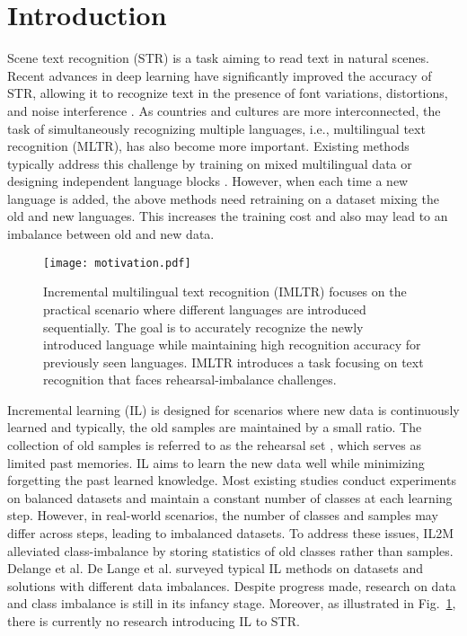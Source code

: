 \documentclass[10pt,twocolumn,letterpaper]{article}
\begin{document}
\section{Introduction}
Scene text recognition (STR) is a task aiming to read text in natural scenes. Recent advances in deep learning have significantly improved the accuracy of STR, allowing it to recognize text in the presence of font variations, distortions, and noise interference \cite{ShiBY17crnn,shi2018aster,wang2021visionlan,sheng2019nrtr,fang2022abinet++,zheng2023tps++}. As countries and cultures are more interconnected, the task of simultaneously recognizing multiple languages, i.e., multilingual text recognition (MLTR), has also become more important.
Existing methods typically address this challenge by training on mixed multilingual data \cite{buvsta2018e2emlt,baek2020crafts,nayef2019mlt2019} or designing independent language blocks \cite{huang2021multiocr,fujii2017seqscript,gomez2017improving}. However, when each time a new language is added, the above methods need retraining on a dataset mixing the old and new languages. This increases the training cost \cite{Rebuffi2017icarl,Yan2021DER} and also may lead to an imbalance \cite{belouadah2019IL2M,delange2022clsurvey} between old and new data.


\begin{figure}[]
\centering
\texttt{[image: motivation.pdf]} \caption{
Incremental multilingual text recognition (IMLTR) focuses on the practical scenario where different languages are introduced sequentially. The goal is to accurately recognize the newly introduced language while maintaining high recognition accuracy for previously seen languages.
IMLTR introduces a task focusing on text recognition that faces rehearsal-imbalance challenges.
}
\label{fig1:motivation}
\end{figure}


Incremental learning (IL) is designed for scenarios where new data is continuously learned and typically, the old samples are maintained by a small ratio. The collection of old samples is referred to as the rehearsal set \cite{zhang2022rcil,hu2021distilling}, which serves as limited past memories. IL aims to learn the new data well while minimizing forgetting the past learned knowledge. Most existing studies \cite{Rebuffi2017icarl, belouadah2019IL2M, zhao2020wa,huang2023resolving} conduct experiments on balanced datasets and maintain a constant number of classes at each learning step. 
However, in real-world scenarios, the number of classes and samples may differ across steps, leading to imbalanced datasets. To address these issues, IL2M \cite{belouadah2019IL2M} alleviated class-imbalance by storing statistics of old classes rather than samples. Delange et al. De Lange et al. \cite{delange2022clsurvey} surveyed typical IL methods on datasets and solutions with different data imbalances. Despite progress made, research on data and class imbalance is still in its infancy stage. Moreover, as illustrated in Fig.~\ref{fig1:motivation}, there is currently no research introducing IL to STR.
\end{document}
